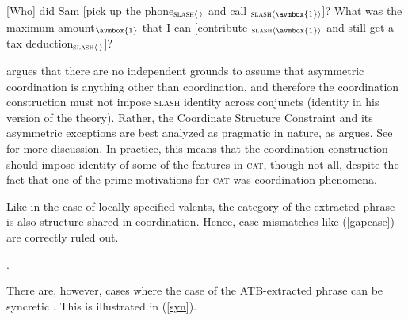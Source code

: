 {%


\begin{exe}
\ex \begin{xlista}
\ex {}[Who] did Sam [pick up the phone$_{\textup{\textsc{slash}} \langle \, \rangle}$ and call \trace$_{\textup{\textsc{slash}} \langle \avmbox{1} \rangle}$]?
\ex What was the maximum amount$_{\avmbox{1}}$ that
I can [contribute \trace$_{\textup{\textsc{slash}} \langle \avmbox{1} \rangle}$ and still get a tax deduction$_{\textup{\textsc{slash}} \langle \, \rangle}$]?
\end{xlista}\label{assym}
\end{exe}


\citet{chavesextr} argues that there are no independent grounds to assume that asymmetric coordination is anything other than coordination, and therefore the coordination construction must not impose \textsc{slash} identity across conjuncts (\gap identity in his version of the theory). Rather, the Coordinate Structure Constraint and its asymmetric exceptions are best analyzed as
pragmatic in nature, as \citet[Chapter~5]{kehler} argues. 
See  for more discussion.
In practice, this means that the coordination construction should impose identity of some of the features in \textsc{cat}, though not all, despite the fact that one of the prime motivations for \textsc{cat} was
coordination phenomena.

Like in the case of locally specified valents, the category of the extracted phrase is also structure-shared
in coordination. Hence, case mismatches like (\ref{gapcase}) are
correctly ruled out.


.
\z

\noindent
There are, however, cases where the case of the ATB-extracted phrase can be syncretic 
\citep{anderson83}. This is illustrated  in (\ref{syn}).

}
